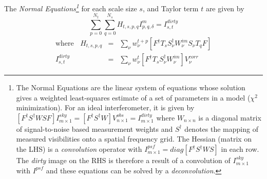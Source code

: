 \documentclass[structabstract]{aa}
\newcommand{\F}{{F}}
\newcommand{\Fd}{{F^\dag}}
\newcommand{\Gnu}{{G_{\nu}}}
\newcommand{\Gdnu}{{G_{\nu}^{\dag}}}
\newcommand{\Sa}{{S}}
\newcommand{\Sd}{{S^\dag}}
\newcommand{\Sna}{{S_{\nu}}}
\newcommand{\Snd}{{S_{\nu}^\dag}}
\newcommand{\Wim}{{W^{im}}}
\newcommand{\Wimn}{{W^{im}_{\nu}}}
\newcommand{\wnt}{{w_{\nu}^t}}
\newcommand{\wntp}{{w_{\nu}^{t+p}}}
\newcommand{\Wntd}{{{W^{mfs}_t}^\dag}}
\begin{document}
The {\it Normal Equations\footnote
{
The Normal Equations are the linear system of equations whose solution 
gives a weighted least-squares estimate of a set of parameters in a model  
($\chi^2$ minimization). 
For an ideal interferometer, it is given by 
$[\Fd \Sd W \Sa \F ] I^{sky}_{m\times 1} = [\Fd \Sd W] V^{obs}_{n\times 1} = I^{dirty}_{m\times 1}$
where $W_{n\times n}$ is a diagonal matrix of signal-to-noise based measurement weights
and $\Sd$ denotes the mapping of measured visibilities onto a spatial frequency grid.
The Hessian (matrix on the LHS) is a {\it convolution} operator with 
$I^{psf}_{m\times 1} = diag[\Fd \Sd W \Sa]$ in each row. 
The {\it dirty} image on the RHS is therefore a result of a convolution of $I^{sky}_{m\times 1}$ with $I^{psf}$
and these equations can be solved by a {\it deconvolution}. 
}
}for each scale size $s$, and Taylor term $t$ are given by
\begin{equation}
\sum_{p=0}^{N_t}\sum_{q=0}^{N_s} H_{t,s,p,q} I^{m}_{p,q,\delta} = I^{dirty}_{s,t}
\label{HESS}
\end{equation}
\begin{eqnarray}
\label{HESS1}
\mathrm{where} ~~~~ H_{t,s,p,q} &=& \sum_{\nu} \wntp [\Fd T_s \Snd\Wimn\Sna T_q \F] \\
\label{HESS2}
I^{dirty}_{s,t} &=&  \sum_{\nu}\wnt[\Fd T_s \Snd\Wimn] V^{corr}_{\nu} 
\end{eqnarray}


\end{document}
